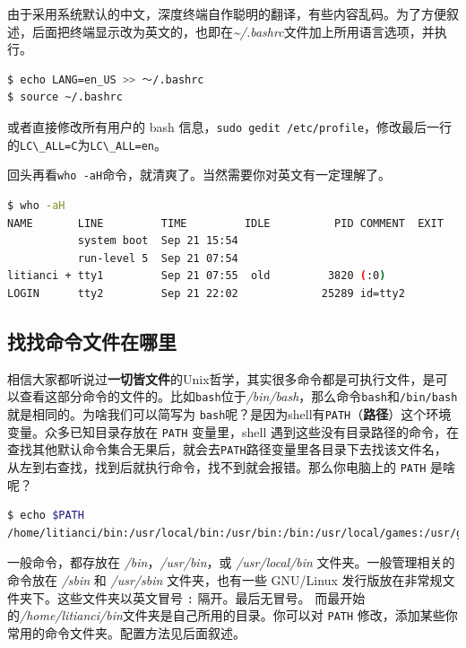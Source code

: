 \documentclass[doctor,openright,twoside]{sjtuthesis}
\newcommand{\passthrough}[1]{#1}
\theoremstyle{plain}
\theoremstyle{definition}
\theoremstyle{remark}
\theoremstyle{ocrenumbox}
\theoremstyle{plain}
\begin{document}
由于采用系统默认的中文，深度终端自作聪明的翻译，有些内容乱码。为了方便叙述，后面把终端显示改为英文的，也即在\emph{\textasciitilde{}/.bashrc}文件加上所用语言选项，并执行。

\begin{lstlisting}[language=bash]
$ echo LANG=en_US >> ～/.bashrc
$ source ~/.bashrc
\end{lstlisting}

或者直接修改所有用户的 bash
信息，\passthrough{\lstinline!sudo gedit /etc/profile!}，修改最后一行的\passthrough{\lstinline!LC\_ALL=C!}为\passthrough{\lstinline!LC\_ALL=en!}。

回头再看\passthrough{\lstinline!who -aH!}命令，就清爽了。当然需要你对英文有一定理解了。

\begin{lstlisting}[language=bash]
$ who -aH
NAME       LINE         TIME         IDLE          PID COMMENT  EXIT
           system boot  Sep 21 15:54
           run-level 5  Sep 21 07:54
litianci + tty1         Sep 21 07:55  old         3820 (:0)
LOGIN      tty2         Sep 21 22:02             25289 id=tty2
\end{lstlisting}

\subsection{找找命令文件在哪里}

相信大家都听说过\textbf{一切皆文件}的Unix哲学，其实很多命令都是可执行文件，是可以查看这部分命令的文件的。比如\passthrough{\lstinline!bash!}位于\emph{/bin/bash}，那么命令\passthrough{\lstinline!bash!}和\passthrough{\lstinline!/bin/bash!}就是相同的。为啥我们可以简写为
\passthrough{\lstinline!bash!}呢？是因为shell有\passthrough{\lstinline!PATH!}（\textbf{路径}）这个环境变量。众多已知目录存放在
\passthrough{\lstinline!PATH!} 变量里，shell
遇到这些没有目录路径的命令，在查找其他默认命令集合无果后，就会去\passthrough{\lstinline!PATH!}路径变量里各目录下去找该文件名，从左到右查找，找到后就执行命令，找不到就会报错。那么你电脑上的
\passthrough{\lstinline!PATH!} 是啥呢？

\begin{lstlisting}[language=bash]
$ echo $PATH
/home/litianci/bin:/usr/local/bin:/usr/bin:/bin:/usr/local/games:/usr/games:/sbin:/usr/sbin
\end{lstlisting}

一般命令，都存放在 \emph{/bin}，\emph{/usr/bin}，或
\emph{/usr/local/bin} 文件夹。一般管理相关的命令放在 \emph{/sbin} 和
\emph{/usr/sbin} 文件夹，也有一些 GNU/Linux
发行版放在非常规文件夹下。这些文件夹以英文冒号
\passthrough{\lstinline!:!} 隔开。最后无冒号。
而最开始的\emph{/home/litianci/bin}文件夹是自己所用的目录。你可以对
\passthrough{\lstinline!PATH!}
修改，添加某些你常用的命令文件夹。配置方法见后面叙述。
\end{document}

